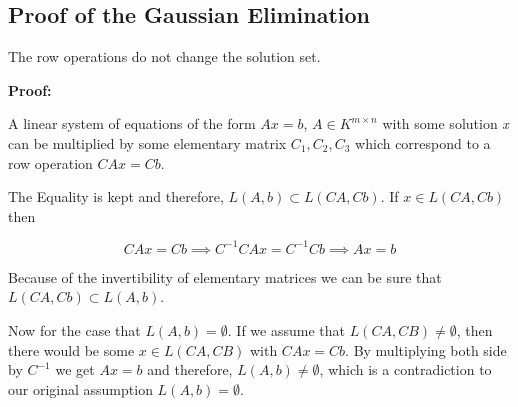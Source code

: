 

\subsection{Proof of the Gaussian Elimination}

The row operations do not change the solution set. 
\vspace{\baselineskip}

\textbf{Proof:}

A linear system of equations of the form \(Ax = b\), \(A \in K^{m \times n}\) with some solution
\emph{x} can be multiplied by some elementary matrix \(C_1, C_2, C_3\) which correspond to a row 
operation \(CAx = Cb\).
\vspace{\baselineskip}

The Equality is kept and therefore, \(L(A,b) \subset L(CA, Cb)\). If \(x \in L(CA, Cb)\) then

\[
	CAx = Cb \implies C^{-1}CAx = C^{-1}Cb \implies Ax = b
\]

Because of the invertibility of elementary matrices we can be sure that  \(L(CA, Cb) \subset L(A,b) \).
\vspace{\baselineskip}

Now for the case that \(L(A,b) = \emptyset\). If we assume that \(L(CA,CB) \ne \emptyset \), then 
there would be some \(x \in L(CA,CB)\) with \(CAx = Cb\). By multiplying both side by \(C^{-1}\) we 
get \(Ax = b\) and therefore, \(L(A, b) \ne \emptyset \),  which is a contradiction to our original
assumption  \(L(A,b) = \emptyset\).

